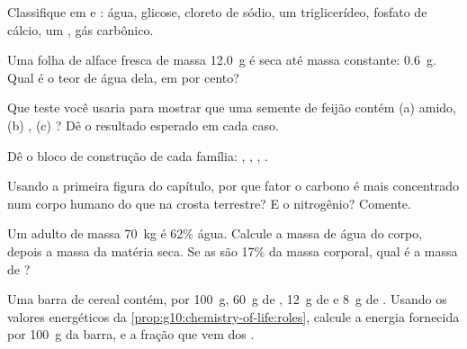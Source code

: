 \begin{exercise}[$\star$]\label{exo:g10:chemistry-of-life:2}
Classifique em  e : água, glicose,
cloreto de sódio, um triglicerídeo, fosfato de cálcio, um ,
gás carbônico.
\end{exercise}

\begin{exercise}[$\star$]\label{exo:g10:chemistry-of-life:3}
Uma folha de alface fresca de massa \qty{12.0}{g} é seca até massa
constante: \qty{0.6}{g}. Qual é o teor de água dela, em por cento?
\end{exercise}

\begin{exercise}[$\star$]\label{exo:g10:chemistry-of-life:4}
Que teste você usaria para mostrar que uma semente de feijão contém (a)
amido, (b) , (c) ? Dê o resultado esperado em cada caso.
\end{exercise}

\begin{exercise}[$\star$]\label{exo:g10:chemistry-of-life:5}
Dê o bloco de construção de cada família: , ,
, .
\end{exercise}

\begin{exercise}[$\star\star$]\label{exo:g10:chemistry-of-life:6}
Usando a primeira figura do capítulo, por que fator o carbono é mais
concentrado num corpo humano do que na crosta terrestre? E o
nitrogênio? Comente.
\end{exercise}

\begin{exercise}[$\star\star$]\label{exo:g10:chemistry-of-life:7}
Um adulto de massa \qty{70}{kg} é 62\% água. Calcule a massa de água do
corpo, depois a massa da matéria seca. Se as  são 17\% da
massa corporal, qual é a massa de ?
\end{exercise}

\begin{exercise}[$\star\star$]\label{exo:g10:chemistry-of-life:8}
Uma barra de cereal contém, por \qty{100}{g}, \qty{60}{g} de
, \qty{12}{g} de  e \qty{8}{g} de . Usando
os valores energéticos da \cref{prop:g10:chemistry-of-life:roles},
calcule a energia fornecida por \qty{100}{g} da barra, e a fração que
vem dos .
\end{exercise}

